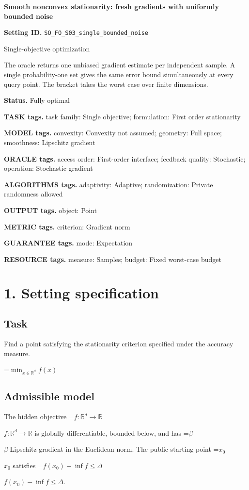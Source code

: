 \documentclass[10pt,a4paper]{article}
\newcommand{\AtlasMath}[1]{\par\begingroup\centering\setbox0=\hbox{$\displaystyle #1$}\ifdim\wd0>1.4\linewidth\typeout{ATLAS WIDE FORMULA: \the\wd0}\fi\ifdim\wd0>\linewidth\resizebox{\linewidth}{!}{\box0}\else\box0\fi\par\endgroup}
\newcommand{\AtlasInlineMath}[1]{\begingroup\setbox0=\hbox{$#1$}\ifdim\wd0>.4\linewidth\endgroup\AtlasMath{#1}\else\endgroup$#1$\fi}
\begin{document}
\raggedright

{\LARGE\bfseries\sffamily\color{AtlasNavy} Smooth nonconvex stationarity: fresh gradients with uniformly bounded noise\par}\vspace{5pt}
\textbf{Setting ID.} \texttt{SO\_\allowbreak{}FO\_\allowbreak{}S03\_\allowbreak{}single\_\allowbreak{}bounded\_\allowbreak{}noise}

Single-objective optimization

The oracle returns one unbiased gradient estimate per independent sample. A single probability-one set gives the same error bound simultaneously at every query point. The bracket takes the worst case over finite dimensions.

\textbf{Status.} Fully optimal

\textbf{TASK tags.} task family: Single objective; formulation: First order stationarity

\textbf{MODEL tags.} convexity: Convexity not assumed; geometry: Full space; smoothness: Lipschitz gradient

\textbf{ORACLE tags.} access order: First-order interface; feedback quality: Stochastic; operation: Stochastic gradient

\textbf{ALGORITHMS tags.} adaptivity: Adaptive; randomization: Private randomness allowed

\textbf{OUTPUT tags.} object: Point

\textbf{METRIC tags.} criterion: Gradient norm

\textbf{GUARANTEE tags.} mode: Expectation

\textbf{RESOURCE tags.} measure: Samples; budget: Fixed worst-case budget

\section{1. Setting specification}
\subsection{Task}
Find a point satisfying the stationarity criterion specified under the accuracy measure.


\AtlasMath{\min_{x\in \mathbb{R}^d}f(x)}


\subsection{Admissible model}
The hidden objective \AtlasInlineMath{f:\mathbb R^d\to\mathbb R} is globally differentiable, bounded below, and has \AtlasInlineMath{\beta}-Lipschitz gradient in the Euclidean norm. The public starting point \AtlasInlineMath{x_0} satisfies \AtlasInlineMath{f(x_0)-\inf f\le\Delta}.
\end{document}

